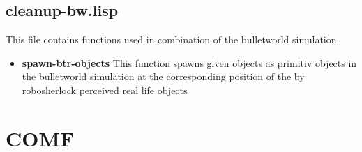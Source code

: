 \documentclass[main.tex]{subfiles}
\begin{document}
	    \subsection{cleanup-bw.lisp}
        This file contains functions used in combination of the bulletworld simulation.
		\begin{itemize}
			\item \textbf{spawn-btr-objects}
			This function spawns given objects as primitiv objects in the bulletworld simulation at the corresponding position of the by robosherlock perceived real life objects  
		\end{itemize}
	  	
	  	\section{COMF}
\end{document}
